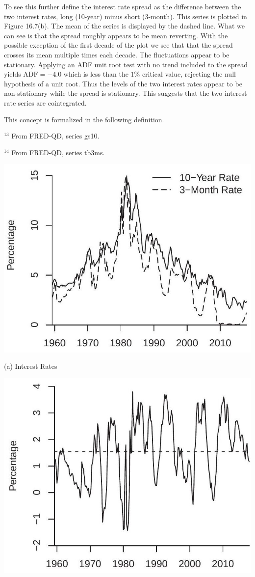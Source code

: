\documentclass[10pt]{article}
\begin{document}
To see this further define the interest rate spread as the difference between the two interest rates, long (10-year) minus short (3-month). This series is plotted in Figure 16.7(b). The mean of the series is displayed by the dashed line. What we can see is that the spread roughly appears to be mean reverting. With the possible exception of the first decade of the plot we see that that the spread crosses its mean multiple times each decade. The fluctuations appear to be stationary. Applying an ADF unit root test with no trend included to the spread yields $\mathrm{ADF}=-4.0$ which is less than the $1 \%$ critical value, rejecting the null hypothesis of a unit root. Thus the levels of the two interest rates appear to be non-stationary while the spread is stationary. This suggests that the two interest rate series are cointegrated.

This concept is formalized in the following definition.

${ }^{13}$ From FRED-QD, series gs10.

${ }^{14}$ From FRED-QD, series tb3ms.

\includegraphics[max width=\textwidth]{2022_10_23_e99fc7c58db661c6f219g-31}

(a) Interest Rates

\includegraphics[max width=\textwidth]{2022_10_23_e99fc7c58db661c6f219g-31(1)}
\end{document}
